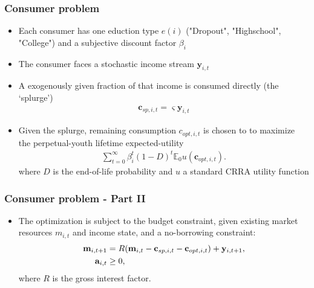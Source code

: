 \documentclass[pdflatex]{beamer}
\begin{document}
\begin{frame}
\frametitle{Consumer problem}


	\begin{itemize}
		\item Each consumer has one eduction type $e(i)$ ("Dropout", "Highschool", "College") and a subjective discount factor $\beta_i$
		\item The consumer faces a stochastic income stream $\mathbf{y}_{i,t}$
		\item A exogenously given fraction of that income is consumed directly (the `splurge')
			\begin{align}
			\mathbf{c}_{sp,i,t} = \varsigma \mathbf{y}_{i,t}
			\end{align}
		\item Given the splurge, remaining consumption $c_{opt,i,t}$ is chosen to to maximize the perpetual-youth lifetime expected-utility
			\begin{align}
			\sum_{t=0}^{\infty}\beta_i^t (1-D)^t \mathbb{E}_0 u(\mathbf{c}_{opt,i,t}).
			\end{align}
			where $D$ is the end-of-life probability and $u$ a standard CRRA utility function	
	\end{itemize}

\end{frame}

\begin{frame}
\frametitle{Consumer problem - Part II}

	\begin{itemize}
		\item The optimization is subject to the budget constraint, given existing market resources $m_{i,t}$ and income state, and a no-borrowing constraint: 
		\begin{align}
		\mathbf{m}_{i,t+1} &= R (\mathbf{m}_{i,t} - \mathbf{c}_{sp,i,t} - \mathbf{c}_{opt,i,t}) + \mathbf{y}_{i,t+1}, \\
		\mathbf{a}_{i,t} &\geq 0,   \notag
		\end{align}
		where $R$ is the gross interest factor.
	\end{itemize}



\end{frame}
\end{document}
